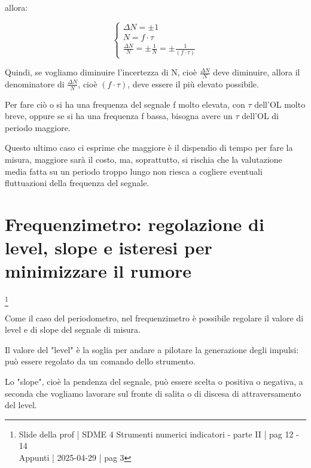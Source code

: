 allora: 

{
    \Large 
    \begin{equation}
        \begin{cases}
        \Delta N = \pm 1 
        \\ 
        N = f \cdot \tau
        \\
        \frac{\Delta N}{N} = \pm \frac{1}{N} = \pm \frac{1}{(f \cdot \tau)}
    \end{cases}
    \end{equation}
}

Quindi, se vogliamo diminuire l'incertezza di N, cioè $\frac{\Delta N}{N}$ deve diminuire, 
allora il denominatore di $\frac{\Delta N}{N}$, cioè $(f \cdot \tau)$, deve essere il più elevato possibile. \newline 

Per fare ciò o si ha una frequenza del segnale f molto elevata, con $\tau$ dell'OL molto breve, 
oppure se si ha una frequenza f bassa, bisogna avere un $\tau$ dell'OL di periodo maggiore. \newline 

Questo ultimo caso ci esprime che maggiore è il dispendio di tempo per fare la misura, 
maggiore sarà il costo, 
ma, soprattutto, si rischia  
che la valutazione media fatta su un periodo troppo lungo non riesca a cogliere eventuali fluttuazioni della frequenza del segnale.\newline 

\newpage 

\section{Frequenzimetro: regolazione di level, slope e isteresi per minimizzare il rumore}
\footnote{Slide della prof | SDME 4 Strumenti numerici indicatori - parte II | pag 12 - 14 \\  
Appunti | 2025-04-29 | pag 3} 

Come il caso del periodometro, nel frequenzimetro è possibile regolare il valore di level e di slope del segnale di misura. \newline 

Il valore del "level" è la soglia per andare a pilotare la generazione degli impulsi: può essere regolato da un comando dello strumento. \newline 

Lo "slope", cioè la pendenza del segnale, può essere scelta o positiva o negativa, 
a seconda che vogliamo lavorare sul fronte di salita o di discesa di attraversamento del level. \newline 

